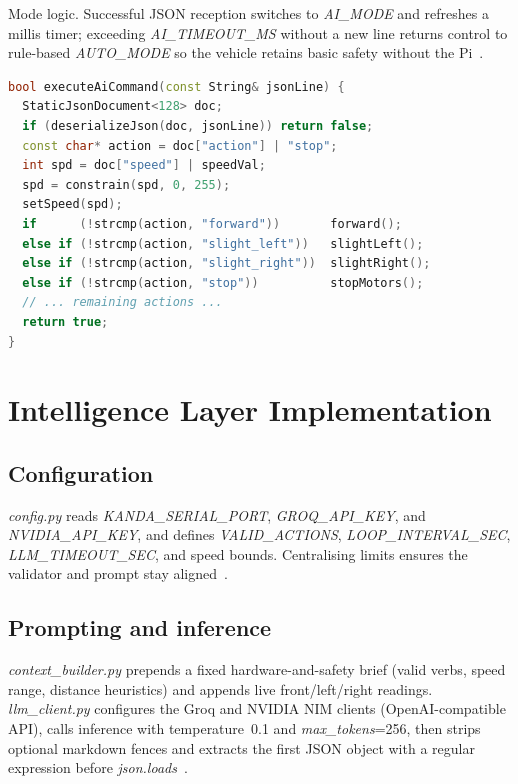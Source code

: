 Mode logic. Successful JSON reception switches to \textit{AI\_MODE} and refreshes a millis timer; exceeding \textit{AI\_TIMEOUT\_MS} without a new line returns control to rule-based \textit{AUTO\_MODE} so the vehicle retains basic safety without the Pi~\cite{brooks1986robust}.

\begin{lstlisting}[language=C++, basicstyle=\itshape\footnotesize, caption={Excerpt: JSON command dispatch on ESP32 (simplified)}, label={lst:fw_json}]
bool executeAiCommand(const String& jsonLine) {
  StaticJsonDocument<128> doc;
  if (deserializeJson(doc, jsonLine)) return false;
  const char* action = doc["action"] | "stop";
  int spd = doc["speed"] | speedVal;
  spd = constrain(spd, 0, 255);
  setSpeed(spd);
  if      (!strcmp(action, "forward"))       forward();
  else if (!strcmp(action, "slight_left"))   slightLeft();
  else if (!strcmp(action, "slight_right"))  slightRight();
  else if (!strcmp(action, "stop"))          stopMotors();
  // ... remaining actions ...
  return true;
}
\end{lstlisting}

\section{Intelligence Layer Implementation}
\label{sec:impl_ai}

\subsection{Configuration}

\textit{config.py} reads \textit{KANDA\_SERIAL\_PORT}, \textit{GROQ\_API\_KEY}, and \textit{NVIDIA\_API\_KEY}, and defines \textit{VALID\_ACTIONS}, \textit{LOOP\_INTERVAL\_SEC}, \textit{LLM\_TIMEOUT\_SEC}, and speed bounds. Centralising limits ensures the validator and prompt stay aligned~\cite{huang2023grounded}.

\subsection{Prompting and inference}

\textit{context\_builder.py} prepends a fixed hardware-and-safety brief (valid verbs, speed range, distance heuristics) and appends live front/left/right readings. \textit{llm\_client.py} configures the Groq and NVIDIA NIM clients (OpenAI-compatible API), calls inference with temperature~0.1 and \textit{max\_tokens}=256, then strips optional markdown fences and extracts the first JSON object with a regular expression before \textit{json.loads}~\cite{ahn2022saycan}.

